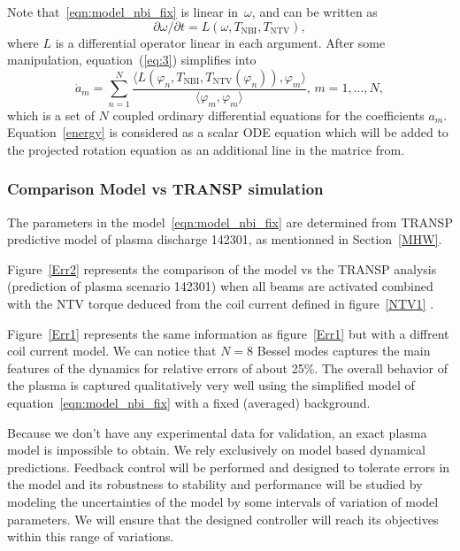 \documentclass[12pt,lot, lof]{puthesis}
\begin{document}
Note that~\eqref{eqn:model_nbi_fix} is linear in~$\omega$, and can be written as
\begin{equation}
\label{eq:3}
\partial \omega/\partial t=L(\omega,T_\text{NBI},T_\text{NTV}),
\end{equation}
where $L$ is a differential operator linear in each argument. After some manipulation, equation~(\ref{eq:3}) simplifies into  
%
\begin{equation*}
  \dot a_m = \sum_{n=1}^N \frac{\langle L(\varphi_n, T_\text{NBI}, T_\text{NTV}(\varphi_n)),
    \varphi_m\rangle}{\langle \varphi_m,\varphi_m\rangle},\, m=1,\ldots,N,
\end{equation*}
which is a set of $N$ coupled ordinary differential equations for the coefficients $a_m$.\\
%
Equation~{\ref{energy}} is considered as a scalar ODE equation which will be added to the projected rotation equation as an additional line in the matrice from.

\subsubsection{Comparison Model vs TRANSP simulation}

The parameters in the model~\eqref{eqn:model_nbi_fix} are determined from TRANSP predictive model of plasma discharge 142301, as mentionned in Section~\ref{MHW}.  

Figure~\ref{Err2} represents the comparison of the model vs the TRANSP analysis (prediction of plasma scenario 142301) when all beams are activated combined with the NTV torque deduced from the coil current defined in figure~\ref{NTV1} .  

Figure~\ref{Err1} represents the same information as figure~\ref{Err1} but with a diffrent coil current model. We can notice that $N = 8$ Bessel modes captures the main features of the dynamics for relative errors of about 25\%.
The overall behavior of the plasma is captured qualitatively very well using the simplified model of equation~\eqref{eqn:model_nbi_fix} with a fixed (averaged) background. 

Because we don't have any experimental data for validation, an exact plasma model is impossible to obtain. We rely exclusively on model based dynamical predictions. Feedback control will be performed and designed to tolerate errors in the model and its robustness to stability and performance will be studied by modeling the uncertainties of the model by some intervals of variation of model parameters. We will ensure that the designed controller will reach its objectives within this range of variations.
\end{document}
